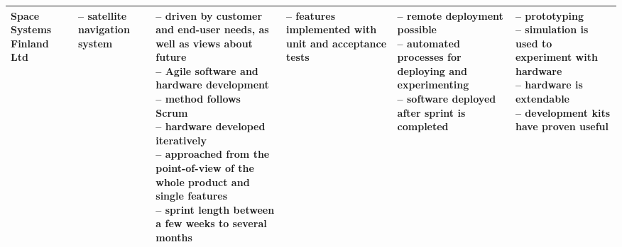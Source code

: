\documentclass[english]{tktltiki2}
\begin{document}
\begin{landscape}
\begin{longtable}{|p{2.5cm}|p{1.5cm}|p{4cm}|p{4cm}|p{4cm}|p{4cm}|}
        Space Systems Finland Ltd &
        – satellite navigation system &
        \parbox[t]{4cm}{– driven by customer and end-user needs, as well as views about future \\
                        – Agile software and hardware development \\
                        – method follows Scrum \\
                        – hardware developed iteratively \\
                        – approached from the point-of-view of the whole product and single features \\
                        – sprint length between a few weeks to several months} &
        \parbox[t]{4cm}{– features implemented with unit and acceptance tests} &
        \parbox[t]{4cm}{– remote deployment possible \\
                        – automated processes for deploying and experimenting \\
                        – software deployed after sprint is completed} &
        \parbox[t]{4cm}{– prototyping \\
                        – simulation is used to experiment with hardware \\
                        – hardware is extendable \\
                        – development kits have proven useful} \\

        \hline


\end{longtable}
\end{landscape}
\end{document}
